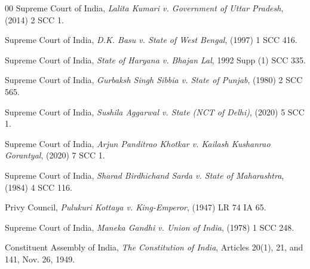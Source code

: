 \documentclass[conference]{IEEEtran}
\begin{document}
\begin{thebibliography}{00}
Supreme Court of India, \textit{Lalita Kumari v. Government of Uttar Pradesh}, (2014) 2 SCC 1.

Supreme Court of India, \textit{D.K. Basu v. State of West Bengal}, (1997) 1 SCC 416.

Supreme Court of India, \textit{State of Haryana v. Bhajan Lal}, 1992 Supp (1) SCC 335.

Supreme Court of India, \textit{Gurbaksh Singh Sibbia v. State of Punjab}, (1980) 2 SCC 565.

Supreme Court of India, \textit{Sushila Aggarwal v. State (NCT of Delhi)}, (2020) 5 SCC 1.

Supreme Court of India, \textit{Arjun Panditrao Khotkar v. Kailash Kushanrao Gorantyal}, (2020) 7 SCC 1.

Supreme Court of India, \textit{Sharad Birdhichand Sarda v. State of Maharashtra}, (1984) 4 SCC 116.

Privy Council, \textit{Pulukuri Kottaya v. King-Emperor}, (1947) LR 74 IA 65.

Supreme Court of India, \textit{Maneka Gandhi v. Union of India}, (1978) 1 SCC 248.

Constituent Assembly of India, \textit{The Constitution of India}, Articles 20(1), 21, and 141, Nov. 26, 1949.

\end{thebibliography}
\end{document}
